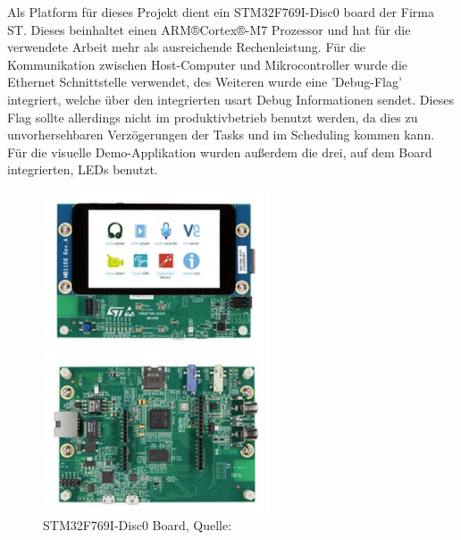\documentclass[../EDF Master Thesis.tex]{subfiles}
\begin{document}
Als Platform für dieses Projekt dient ein STM32F769I-Disc0 board der Firma ST.
Dieses beinhaltet einen ARM®Cortex®-M7 Prozessor und hat für die verwendete Arbeit mehr als ausreichende Rechenleistung.
Für die Kommunikation zwischen Host-Computer und Mikrocontroller wurde die Ethernet Schnittstelle verwendet, des Weiteren wurde eine 'Debug-Flag' integriert, welche über den integrierten \ac{usart} Debug Informationen sendet.
Dieses Flag sollte allerdings nicht im produktivbetrieb benutzt werden, da dies zu unvorhersehbaren Verzögerungen der Tasks und im Scheduling kommen kann.
Für die visuelle Demo-Applikation wurden außerdem die drei, auf dem Board integrierten, LEDs benutzt.

\begin{figure}[ht!]
    \begin{center}
        \includegraphics[width=0.6\textwidth]{attachments/stm32f769i-disc0.pdf}
    \end{center}
    \caption{STM32F769I-Disc0 Board, Quelle: \autocite{stm:001}}
    \label{fig:STM32F769I-Disc0_board}
\end{figure}
\end{document}
